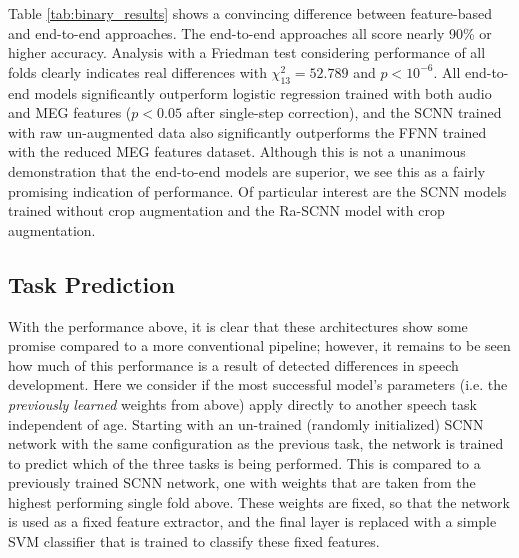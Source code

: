 \documentclass[fleqn,10pt]{wlscirep}
\begin{document}
Table \ref{tab:binary_results} shows a convincing difference between feature-based and end-to-end approaches. The end-to-end approaches all score nearly 90\% or higher accuracy. Analysis with a Friedman test considering performance of all folds clearly indicates real differences with $\chi^2_{13}=52.789$ and $p<10^{-6}$. All end-to-end models significantly outperform logistic regression trained with both audio and MEG features ($p<0.05$ after single-step correction), and the SCNN trained with raw un-augmented data also significantly outperforms the FFNN trained with the reduced MEG features dataset. Although this is not a unanimous demonstration that the end-to-end models are superior, we see this as a fairly promising indication of performance. Of particular interest are the SCNN models trained without crop augmentation and the Ra-SCNN model with crop augmentation.

\subsection*{Task Prediction}

With the performance above, it is clear that these architectures show some promise compared to a more conventional pipeline; however, it remains to be seen how much of this performance is a result of detected differences in speech development. Here we consider if the most successful model's parameters (i.e. the {\em previously learned} weights from above) apply directly to another speech task independent of age. Starting with an un-trained (randomly initialized) SCNN network with the same configuration as the previous task, the network is trained to predict which of the three tasks is being performed. This is compared to a previously trained SCNN network, one with weights that are taken from the highest performing single fold above. These weights are fixed, so that the network is used as a fixed feature extractor, and the final layer is replaced with a simple SVM classifier that is trained to classify these fixed features.
\end{document}
